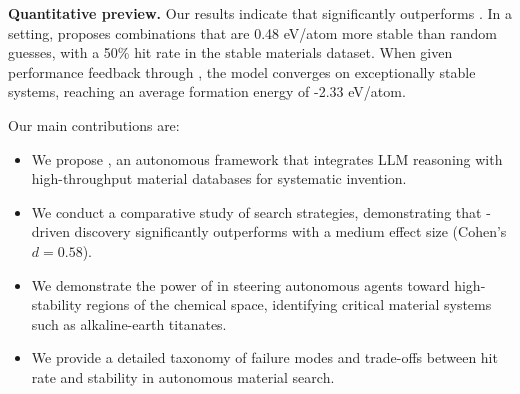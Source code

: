 {\bf Quantitative preview.}
Our results indicate that \ours significantly outperforms \randomsearch. In a \zeroshot setting, \ours proposes combinations that are 0.48 eV/atom more stable than random guesses, with a 50\% hit rate in the stable materials dataset. When given performance feedback through \activelearning, the model converges on exceptionally stable systems, reaching an average formation energy of -2.33 eV/atom.

Our main contributions are:
\begin{itemize}[leftmargin=*,itemsep=0pt,topsep=0pt]
    \item We propose \ours, an autonomous framework that integrates LLM reasoning with high-throughput material databases for systematic invention.
    \item We conduct a comparative study of search strategies, demonstrating that \llm-driven discovery significantly outperforms \randomsearch with a medium effect size (Cohen's $d = 0.58$).
    \item We demonstrate the power of \activelearning in steering autonomous agents toward high-stability regions of the chemical space, identifying critical material systems such as alkaline-earth titanates.
    \item We provide a detailed taxonomy of failure modes and trade-offs between hit rate and stability in autonomous material search.
\end{itemize}
